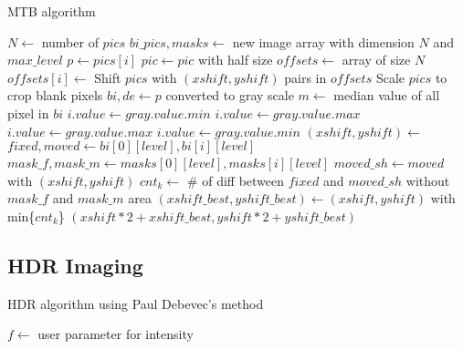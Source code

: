 \documentclass[11pt]{article}
\begin{document}
\begin{algorithm}
\caption{MTB algorithm}
\begin{algorithmic}[1]
	\State $N\gets$ number of $pics$
	\State $bi\_pics, masks\gets$ new image array with dimension $N$ and $max\_level$
		\State $p\gets pics[i]$
			\State {}
			\State $pic\gets pic$ with half size
		\EndFor
	\EndFor
	\State $offsets\gets$ array of size $N$
		\State $offsets[i]\gets$
	\EndFor
	\State Shift $pics$ with $(xshift, yshift)$ pairs in $offsets$
	\State Scale $pics$ to crop blank pixels
\EndFunction
\Statex
{}
	\State $bi, de\gets p$ converted to gray scale
	\State $m\gets$ median value of all pixel in $bi$
			\State $i.value\gets gray.value.min$
		\Else
			\State $i.value\gets gray.value.max$
		\EndIf
	\EndFor
			\State $i.value\gets gray.value.max$
		\Else
			\State $i.value\gets gray.value.min$
		\EndIf
	\EndFor
\EndFunction
\Statex
{}
		\State {}
	\EndIf
	\State $(xshift, yshift)\gets$
	\State $fixed, moved\gets bi[0][level], bi[i][level]$
	\State $mask\_f, mask\_m\gets masks[0][level], masks[i][level]$
		\State $moved\_sh\gets moved$ with $(xshift, yshift)$
		\State $cnt_k\gets$ \# of diff between $fixed$ and $moved\_sh$
without $mask\_f$ and $mask\_m$ area	
	\EndFor
	\State $(xshift\_best, yshift\_best)\gets(xshift, yshift)$ with min\{$cnt_k$\}
	\State\Return$(xshift*2+xshift\_best, yshift*2+yshift\_best)$
\EndFunction
\end{algorithmic}
\end{algorithm}

\subsection{HDR Imaging}

\begin{algorithm}
\caption{HDR algorithm using Paul Debevec's method}
\begin{algorithmic}[1]
\State $f\gets$ user parameter for intensity
\end{algorithmic}
\end{algorithm}
\end{document}
